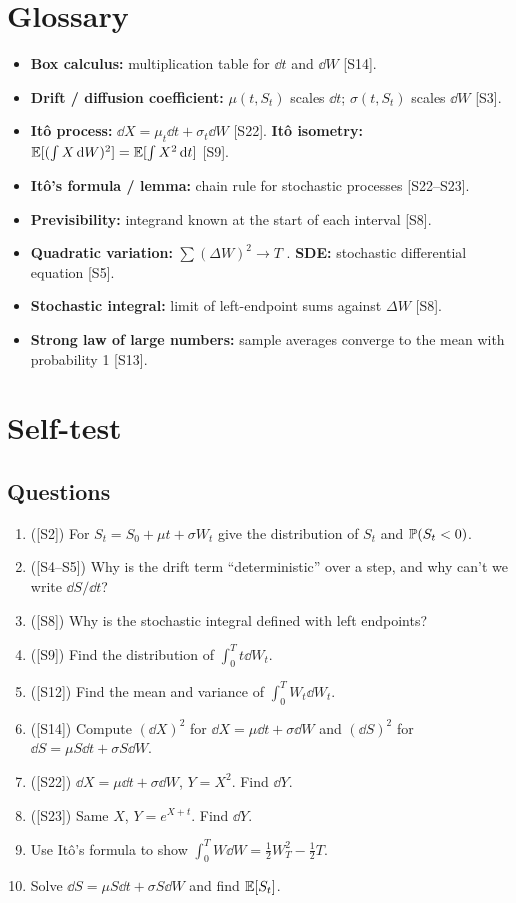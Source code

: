 \documentclass[10pt]{article}
\begin{document}
\section{Glossary}
\begin{itemize}
\item \textbf{Box calculus:} multiplication table for $\dd t$ and $\dd W$ [S14].
\item \textbf{Drift / diffusion coefficient:} $\mu(t,S_t)$ scales $\dd t$; $\sigma(t,S_t)$ scales $\dd W$ [S3].
\item \textbf{It\^o process:} $\dd X=\mu_t\dd t+\sigma_t\dd W$ [S22]. \quad \textbf{It\^o isometry:} $\mathbb{E}[(\int X\,\mathrm{d} W)^2]=\mathbb{E}[\int X^2\,\mathrm{d} t]$ [S9].
\item \textbf{It\^o's formula / lemma:} chain rule for stochastic processes [S22--S23].
\item \textbf{Previsibility:} integrand known at the start of each interval [S8].
\item \textbf{Quadratic variation:} $\sum(\Delta W)^2\to T$ \beyond. \quad \textbf{SDE:} stochastic differential equation [S5].
\item \textbf{Stochastic integral:} limit of left-endpoint sums against $\Delta W$ [S8].
\item \textbf{Strong law of large numbers:} sample averages converge to the mean with probability 1 [S13].
\end{itemize}

\section{Self-test}
\subsection*{Questions}
\begin{enumerate}[label=Q\arabic*.]
\item ([S2]) For $S_t=S_0+\mu t+\sigma W_t$ give the distribution of $S_t$ and $\mathbb{P}(S_t<0)$.
\item ([S4--S5]) Why is the drift term ``deterministic'' over a step, and why can't we write $\dd S/\dd t$?
\item ([S8]) Why is the stochastic integral defined with left endpoints?
\item ([S9]) Find the distribution of $\int_0^Tt\dd W_t$.
\item ([S12]) Find the mean and variance of $\int_0^TW_t\dd W_t$.
\item ([S14]) Compute $(\dd X)^2$ for $\dd X=\mu\dd t+\sigma\dd W$ and $(\dd S)^2$ for $\dd S=\mu S\dd t+\sigma S\dd W$.
\item ([S22]) $\dd X=\mu\dd t+\sigma\dd W$, $Y=X^2$. Find $\dd Y$.
\item ([S23]) Same $X$, $Y=e^{X+t}$. Find $\dd Y$.
\item Use It\^o's formula to show $\int_0^TW\dd W=\frac12W_T^2-\frac12T$.
\item Solve $\dd S=\mu S\dd t+\sigma S\dd W$ and find $\mathbb{E}[S_t]$.
\end{enumerate}
\end{document}
